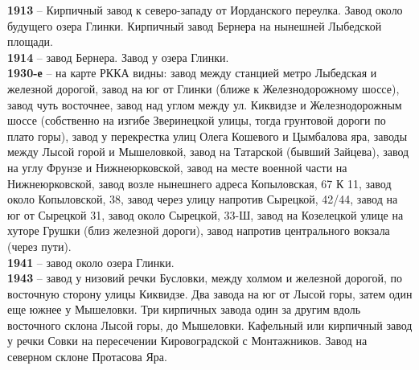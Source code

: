 \noindent\textbf{1913} – Кирпичный завод к северо-западу от Иорданского переулка. Завод около будущего озера Глинки. Кирпичный завод Бернера на нынешней Лыбедской площади.\\

\noindent\textbf{1914} – завод Бернера. Завод у озера Глинки.\\

\noindent\textbf{1930-е} – на карте РККА видны: завод между станцией метро Лыбедская и железной дорогой, завод на юг от Глинки (ближе к Железнодорожному шоссе), завод чуть восточнее, завод над углом между ул. Киквидзе и Железнодорожным шоссе (собственно на изгибе Зверинецкой улицы, тогда грунтовой дороги по плато горы), завод у перекрестка улиц Олега Кошевого и Цымбалова яра, заводы между Лысой горой и Мышеловкой, завод на Татарской (бывший Зайцева), завод на углу Фрунзе и Нижнеюрковской, завод на месте военной части на Нижнеюрковской, завод возле нынешнего адреса Копыловская, 67 К 11, завод около Копыловской, 38, завод через улицу напротив Сырецкой, 42/44, завод на юг от  Сырецкой 31, завод около Сырецкой, 33-Ш, завод на Козелецкой улице на хуторе Грушки (близ железной дороги), завод напротив центрального вокзала (через пути).\\

\noindent\textbf{1941} – завод около озера Глинки.\\

\noindent\textbf{1943} – завод у низовий речки Бусловки, между холмом и железной дорогой, по восточную сторону улицы Киквидзе. Два завода на юг от Лысой горы, затем один еще южнее у Мышеловки. Три кирпичных завода один за другим вдоль восточного склона Лысой горы, до Мышеловки. Кафельный или кирпичный завод у речки Совки на пересечении Кировоградской с Монтажников. Завод на северном склоне Протасова Яра.
